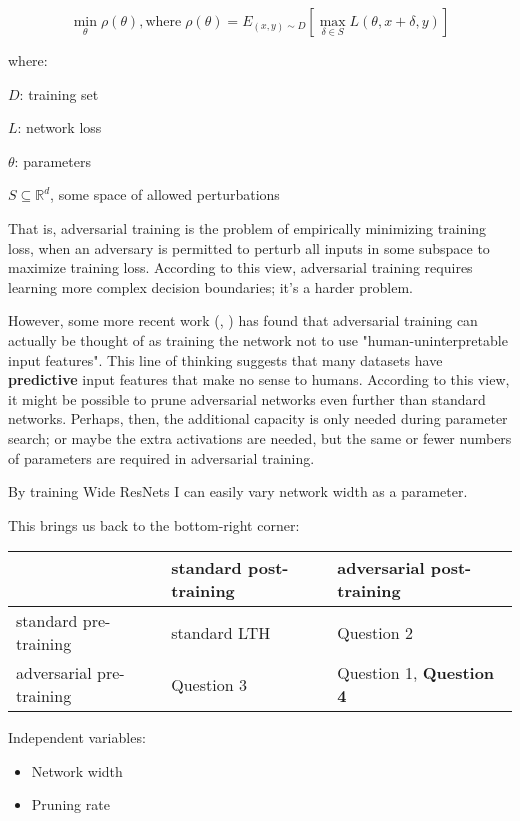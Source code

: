 \documentclass[11pt]{article}
\begin{document}
$$\min_\theta \rho(\theta), \mathrm{where}\; \rho(\theta) = E_{(x,y)\sim D}[\max_{\delta \in S} L(\theta, x+\delta, y) ]$$

where:

\(D\): training set

\(L\): network loss

\(\theta\): parameters

\(S \subseteq \mathbb{R}^d\), some space of allowed perturbations

That is, adversarial training is the problem of empirically minimizing training loss, when an adversary is permitted to perturb all
inputs in some subspace to maximize training loss. According to this view, adversarial training requires learning more complex
decision boundaries; it's a harder problem.

However, some more recent work (\citep{NotBugsFeatures}, \citep{HighFreqGeneralization}) has found that adversarial training can actually be thought of as training the network not to use "human-uninterpretable input features". This line of thinking suggests that many datasets have \textbf{predictive} input features that make no sense to humans. According to this view, it might be possible to prune adversarial networks even further than standard networks. Perhaps, then, the additional capacity is only needed during parameter search; or maybe the extra activations are needed,
but the same or fewer numbers of parameters are required in adversarial training.

By training Wide ResNets \citep{WideResNets} I can easily vary network width as a parameter.

This brings us back to the bottom-right corner:

\begin{center}
\begin{tabular}{lll}
 & standard post-training & adversarial post-training\\
\hline
standard pre-training & standard LTH & Question 2\\
adversarial pre-training & Question 3 & Question 1, \textbf{Question 4}\\
\end{tabular}
\end{center}

Independent variables:
\begin{itemize}
\item Network width
\item Pruning rate
\end{itemize}
\end{document}
